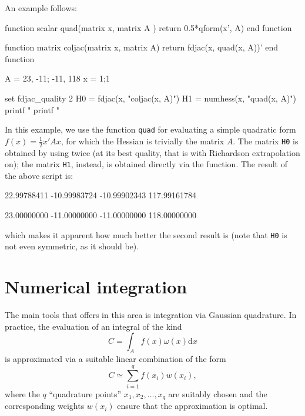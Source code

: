 An example follows:
\begin{code}
function scalar quad(matrix x, matrix A )
    return 0.5*qform(x', A)
end function

function matrix coljac(matrix x, matrix A)
    return fdjac(x, quad(x, A))'
end function

A = {23, -11; -11, 118}
x = {1;1}

set fdjac_quality 2
H0 = fdjac(x, "coljac(x, A)")
H1 = numhess(x, "quad(x, A)")
printf "\n%
printf "\n%
\end{code}
In this example, we use the function \texttt{quad} for evaluating a
simple quadratic form $f(x) = \frac{1}{2} x'Ax$, for which the Hessian
is trivially the matrix $A$. The matrix \texttt{H0} is obtained by
using  twice (at its best quality, that is with Richardson
extrapolation on); the matrix \texttt{H1}, instead, is obtained
directly via the  function. The result of the above
script is:
\begin{code}
   22.99788411  -10.99983724
  -10.99902343  117.99161784

   23.00000000  -11.00000000
  -11.00000000  118.00000000
\end{code}
which makes it apparent how much better the second result is (note
that \texttt{H0} is not even symmetric, as it should be). 

\section{Numerical integration}
\label{sec:numint}

The main tools that  offers in this area is integration via
Gaussian quadrature. In practice, the evaluation of an integral of the
kind
\begin{equation}
  \label{eq:quadint}
  C = \int_{A} f(x) \omega(x) \mathrm{d}x
\end{equation}
is approximated via a suitable linear combination of the form
\begin{equation}
  \label{eq:quadsum}
  C \simeq \sum_{i=1}^q f(x_i) w(x_i) ,
\end{equation}
where the $q$ ``quadrature points'' $x_1, x_2, \ldots, x_q$ are
suitably chosen and the corresponding weights $w(x_i)$ ensure that the
approximation is optimal.

